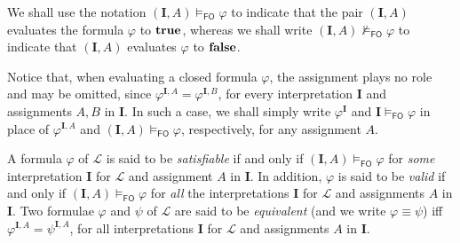 \documentclass[a4paper]{llncs}
\newcommand{\Lang}{\ensuremath{\mathcal{L}\xspace}} %
\newcommand{\corr}[1]{#1}
\newcommand{\inter}{\ensuremath{\mathbf{I}}\xspace}
\newcommand{\fomodels}[2]{#1 \models_{\mathsf{FO}} #2}
\newcommand{\notfomodels}[2]{#1 \not\models_{\mathsf{FO}} #2}
\newcommand{\fosat}[1]{\fomodels{*}{#1}}
\begin{document}

\corr{We shall use the notation $\fomodels{(\inter, A)}{\varphi}$ to indicate
that the pair $(\inter, A)$ evaluates the formula $\varphi$ to $\mathbf{true}$,
whereas we shall write $\notfomodels{(\inter, A)}{\varphi}$ to indicate
that $(\inter, A)$ evaluates $\varphi$ to $\mathbf{false}$.}

Notice that, when evaluating a closed formula $\varphi$, the 
assignment plays no role and may be omitted, since $\varphi^{\inter, 
A} = \varphi^{\inter, B}$, for every interpretation $\inter$ and 
assignments $A,B$ in $\inter$. In such a case, we shall simply write 
$\varphi^{\inter}$
and $\fomodels{\inter}{\varphi}$ in place of $\varphi^{\inter, A}$ 
and $\fomodels{(\inter, A)}{\varphi}$, respectively, for any 
assignment $A$.


A formula $\varphi$ of $\Lang$ is said to be \emph{satisfiable}
if and only if $\fomodels{(\inter,A)}{\varphi}$ for \emph{some} interpretation
$\inter$ for $\Lang$ and assignment $A$ in $\inter$.
In addition, $\varphi$ is said to be \emph{valid} 
if and only if
$\fomodels{(\inter,A)}{\varphi}$ for \emph{all} the interpretations $\inter$
for $\Lang$ and assignments $A$ in $\inter$.
Two formulae $\varphi$ and $\psi$ of $\Lang$ are said to be
\emph{equivalent} (and we write $\varphi \equiv \psi$) iff 
$\varphi^{\inter,A} = \psi^{\inter,A}$,
for all interpretations $\inter$
for $\Lang$ and assignments $A$ in $\inter$.
\end{document}

